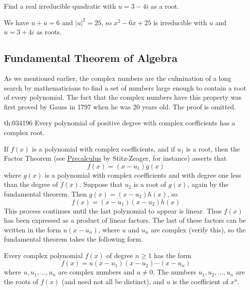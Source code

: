\documentclass{ximera}
\begin{document}
\begin{example}\label{ex:034182}
Find a real irreducible quadratic with $u = 3 - 4i$ as a root.

\begin{explanation}
  We have $u + \overline{u} = 6$ and $|u|^{2} = 25$, so $x^{2} - 6x + 25$ is irreducible with $u$ and $\overline{u} = 3 + 4i$ as roots.
\end{explanation}
\end{example}

\subsection*{Fundamental Theorem of Algebra}

As we mentioned earlier, the complex
numbers are the culmination of a long search by mathematicians to find a
 set of numbers large enough to contain a root of every polynomial. The
fact that the complex numbers have this property was first proved by
Gauss in 1797 when he was 20 years old. The proof is omitted.

\begin{theorem}{th:034196}
Every polynomial of positive degree with complex coefficients has a complex root.
\end{theorem}

If $f(x)$ is a polynomial with complex coefficients, and if $u_{1}$ is a root, then the Factor Theorem (see \href{https://www.stitz-zeager.com/}{Precalculus} by Stitz-Zeager, for instance) asserts that
\begin{equation*}
f(x) = (x-u_1)g(x)
\end{equation*}
where $g(x)$ is a polynomial with complex coefficients and with degree one less than the degree of $f(x)$. Suppose that $u_{2}$ is a root of $g(x)$, again by the fundamental theorem. Then $g(x) = (x - u_{2})h(x)$, so
\begin{equation*}
f(x) = (x-u_1)(x-u_2)h(x)
\end{equation*}
This process continues until the last polynomial to appear is linear. Thus $f(x)$ has been expressed as a product of linear factors. The last of these factors can be written in the form $u(x - u_{n})$, where $u$ and $u_{n}$ are complex (verify this), so the fundamental theorem takes the following form.


\begin{theorem}\label{th:034210}
Every complex polynomial $f(x)$ of degree $n \geq 1$ has the form
\begin{equation*}
f(x) = u(x-u_1)(x-u_2)\cdots (x-u_n)
\end{equation*}
where $u, u_{1}, \dots, u_{n}$ are complex numbers and $u \neq 0$. The numbers $u_{1}, u_{2}, \dots, u_{n}$ are the roots of $f(x)$ (and need not all be distinct), and $u$ is the coefficient of $x^{n}$.
\end{theorem}
\end{document}
